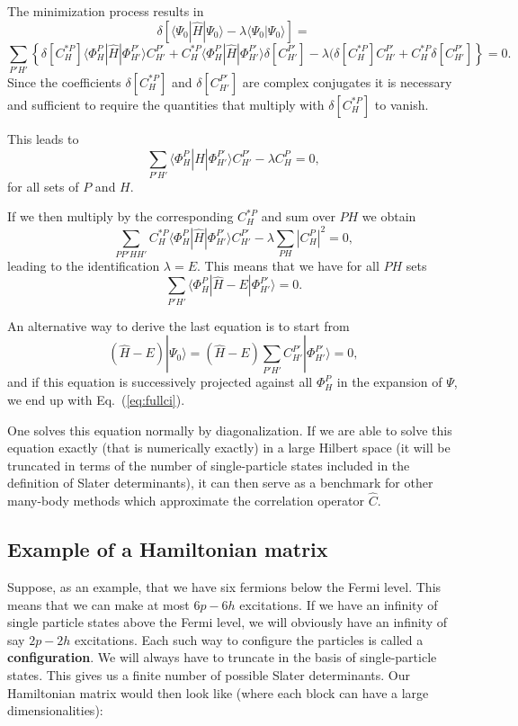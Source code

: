 The minimization process results in 
\[
\delta\left[ \langle \Psi_0 | \hat{H} |\Psi_0 \rangle-\lambda \langle \Psi_0 |\Psi_0 \rangle\right]=
\]
\[
\sum_{P'H'}\left\{\delta[C_H^{*P}]\langle \Phi_H^P | \hat{H} |\Phi_{H'}^{P'} \rangle C_{H'}^{P'}+
C_H^{*P}\langle \Phi_H^P | \hat{H} |\Phi_{H'}^{P'} \rangle \delta[C_{H'}^{P'}]-
\lambda( \delta[C_H^{*P}]C_{H'}^{P'}+C_H^{*P}\delta[C_{H'}^{P'}]\right\} = 0.
\]
Since the coefficients $\delta[C_H^{*P}]$ and $\delta[C_{H'}^{P'}]$ are complex conjugates it is necessary and sufficient to require the quantities that multiply with $\delta[C_H^{*P}]$ to vanish.  

This leads to 
\[
\sum_{P'H'}\langle \Phi_H^P | \hat{H} |\Phi_{H'}^{P'} \rangle C_{H'}^{P'}-\lambda C_H^{P}=0,
\]
for all sets of $P$ and $H$.

If we then multiply by the corresponding $C_H^{*P}$ and sum over $PH$ we obtain
\[ 
\sum_{PP'HH'}C_H^{*P}\langle \Phi_H^P | \hat{H} |\Phi_{H'}^{P'} \rangle C_{H'}^{P'}-\lambda\sum_{PH}|C_H^P|^2=0,
\]
leading to the identification $\lambda = E$. This means that we have for all $PH$ sets
\begin{equation}
\sum_{P'H'}\langle \Phi_H^P | \hat{H} -E|\Phi_{H'}^{P'} \rangle = 0. \label{eq:fullci}
\end{equation}



An alternative way to derive the last equation is to start from 
\[
(\hat{H} -E)|\Psi_0\rangle = (\hat{H} -E)\sum_{P'H'}C_{H'}^{P'}|\Phi_{H'}^{P'} \rangle=0, 
\]
and if this equation is successively projected against all $\Phi_H^P$ in the expansion of $\Psi$, we end up with Eq.~(\ref{eq:fullci}).

One solves this equation normally by diagonalization. If we are able to solve this equation exactly (that is
numerically exactly) in a large Hilbert space (it will be truncated in terms of the number of single-particle states included in the definition
of Slater determinants), it can then serve as a benchmark for other many-body methods which approximate the correlation operator
$\hat{C}$.  


\subsection{Example of a Hamiltonian matrix}

Suppose, as an example, that we have six fermions below the Fermi level.
This means that we can make at most $6p-6h$ excitations. If we have an infinity of single particle states above the Fermi level, we will obviously have an infinity of say $2p-2h$ excitations. Each such way to configure the particles is called a \textbf{configuration}. We will always have to truncate in the basis of single-particle states.
This gives us a finite number of possible Slater determinants. Our Hamiltonian matrix would then look like (where each block can have a large dimensionalities):

